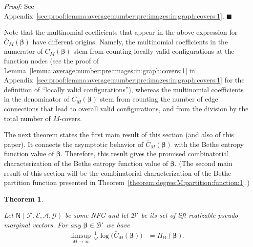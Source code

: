 \documentclass[journal, twocolumn]{IEEEtran}
\newcommand{\set}[1]{\mathcal{#1}}
\newcommand{\graph}[1]{\mathsf{#1}}
\newcommand{\bel}{\beta}
\newcommand{\vbel}{\boldsymbol{\bel}}
\newcommand{\setA}{\set{A}}
\newcommand{\setE}{\set{E}}
\newcommand{\setF}{\set{F}}
\newcommand{\setG}{\set{G}}
\newcommand{\lmpBdown}[1]{\mathcal{B}'_{#1}}
\newcommand{\graphN}{\graph{N}}
\newcommand{\HBethe}{H_{\mathrm{B}}}
\newcommand{\?}{\mathrm{?}}
\newcommand{\qedblack}{\hspace*{\fill}%
  $\blacksquare$\smallskip}
\newtheorem{Theorem}[Lemma]{Theorem}
\newenvironment{Proof}%
  {\noindent \emph{Proof:}}{\qedblack}
\begin{document}
\begin{Proof}
  See
  Appendix~\ref{sec:proof:lemma:average:number:pre:images:in:graph:covers:1}.
\end{Proof}


Note that the multinomial coefficients that appear in the above expression for
$\bar C_M(\vbel)$ have different origins. Namely, the multinomial coefficients
in the numerator of $\bar C_M(\vbel)$ stem from counting locally valid
configurations at the function nodes (see the proof of
Lemma~\ref{lemma:average:number:pre:images:in:graph:covers:1} in
Appendix~\ref{sec:proof:lemma:average:number:pre:images:in:graph:covers:1} for
the definition of ``locally valid configurations''), whereas the multinomial
coefficients in the denominator of $\bar C_M(\vbel)$ stem from counting the
number of edge connections that lead to overall valid configurations, and from
the division by the total number of $M$-covers.


The next theorem states the first main result of this section (and also of
this paper). It connects the asymptotic behavior of $\bar C_M(\vbel)$ with the
Bethe entropy function value of $\vbel$. Therefore, this result gives the
promised combinatorial characterization of the Bethe entropy function value of
$\vbel$. (The second main result of this section will be the combinatorial
characterization of the Bethe partition function presented in
Theorem~\ref{theorem:degree:M:partition:function:1}.)


\begin{Theorem}
  \label{theorem:asymptotic:average:number:pre:images:in:graph:covers:1}

  Let $\graphN(\setF,\setE, \setA, \setG)$ be some NFG and let $\lmpBdown{}$ be its
  set of lift-realizable pseudo-marginal vectors. For any $\vbel \in \lmpBdown{}$
  we have
  \begin{align*}
    \limsup_{M \to \infty}
      \frac{1}{M}
        \log
          \big(
            \bar C_M(\vbel)
          \big)
          &= \HBethe(\vbel).
  \end{align*}
\end{Theorem}
\end{document}
